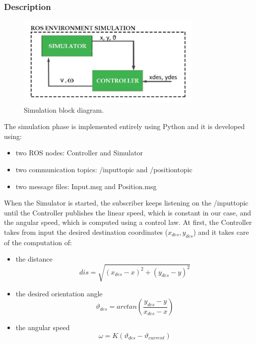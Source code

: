 \documentclass[a4paper,11pt,oneside]{book}
\begin{document}
\subsubsection{Description}
\begin{figure}[!h]
\begin{center}
\includegraphics[width=0.8\textwidth]{figs/Simulation}
\caption[Simulation block diagram]{Simulation block diagram.}
\end{center}
\end{figure}

The simulation phase is implemented entirely using Python and it is developed using:
\begin{itemize}
\item two ROS nodes: Controller and Simulator
\item two communication topics: /input\textunderscore topic and /position\textunderscore topic
\item two message files: Input.msg and Position.msg
\end{itemize}

When the Simulator is started, the subscriber keeps listening on the /input\textunderscore topic until the Controller publishes the linear speed, which is constant in our case, and the angular speed, which is computed using a control law. At first, the Controller takes from input the desired destination coordinates ($x_{des}, y_{des}$) and it takes care of the computation of:
\begin{itemize}
\item the distance
\begin{equation} 
dis = \sqrt{(x_{des} - x)^{2} + (y_{des} - y)^{2}} 
\end{equation}
\item the desired orientation angle 
\begin{equation}
\vartheta_{des} = arctan(\dfrac{y_{des} - y}{x_{des} - x})
\end{equation}
\item the angular speed
\begin{equation}
\omega = K(\vartheta_{des} - \vartheta_{current})
\end{equation}
\end{itemize}
		
\end{document}
